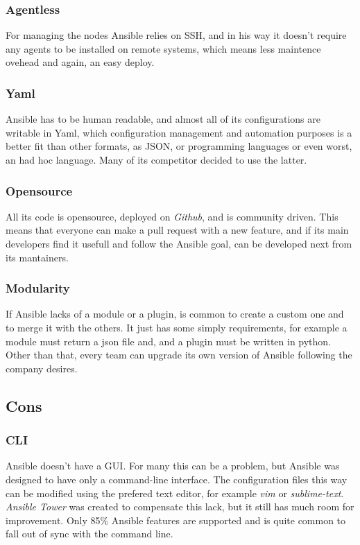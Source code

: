 \documentclass[conference]{IEEEtran}
\begin{document}
\subsubsection{Agentless}
For managing the nodes Ansible relies on SSH, and in his way it doesn't require any agents to be installed on remote systems, which means less maintence ovehead and again, an easy deploy.
\subsubsection{Yaml}
Ansible has to be human readable, and almost all of its configurations are writable in Yaml, which configuration management and automation purposes is a better fit than other formats, as JSON, or programming languages or even worst, an had hoc language. Many of its competitor decided to use the latter.
\subsubsection{Opensource}
All its code is opensource, deployed on \textit{Github}, and is community driven. This means that everyone can make a pull request with a new feature, and if its main developers find it usefull and follow the Ansible goal, can be developed next from its mantainers.
\subsubsection{Modularity}
If Ansible lacks of a module or a plugin, is common to create a custom one and to merge it with the others. It just has some simply requirements, for example a module must return a json file and, and a plugin must be written in python. Other than that, every team can upgrade its own version of Ansible following the company desires.
\subsection{Cons}
\subsubsection{CLI}
Ansible doesn't have a GUI. For many this can be a problem, but Ansible was designed to have only a command-line interface. The configuration files this way can be modified using the prefered text editor, for example \textit{vim} or \textit{sublime-text}. \textit{Ansible Tower} was created to compensate this lack, but it still has much room for improvement. Only 85\% Ansible features are supported and is quite common to fall out of sync with the command line.
\end{document}
